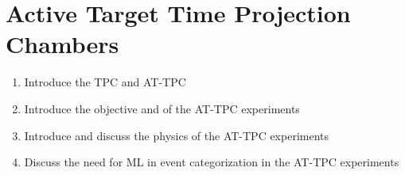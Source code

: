 \section{Active Target Time Projection Chambers}\label{sec:attpc}


\begin{enumerate}
	\item Introduce the TPC and AT-TPC
	\item Introduce the objective and of the AT-TPC experiments
	\item Introduce and discuss the physics of the AT-TPC experiments 
	\item Discuss the need for ML in event categorization in the AT-TPC experiments 
\end{enumerate}